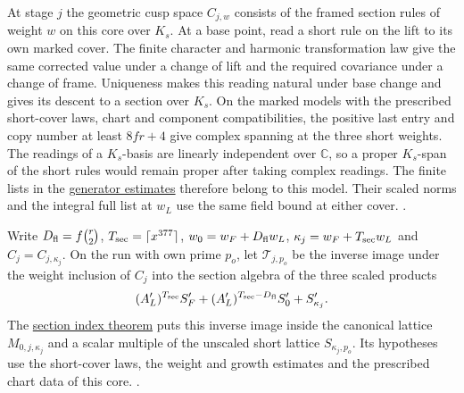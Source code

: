 At stage \(j\) the geometric cusp space \(C_{j,w}\) consists of the
framed section rules of weight \(w\) on this core over \(K_s\).
At a base point, read a short rule on the lift to its own marked
cover. The finite character and harmonic transformation law give the
same corrected value under a change of lift and the required covariance
under a change of frame. Uniqueness makes this reading natural under
base change and gives its descent to a section over \(K_s\). On the
marked models with the prescribed short-cover laws, chart and
component compatibilities, the positive last entry and copy number
at least \(8fr+4\) give complex spanning at the three short weights.
The readings of a \(K_s\)-basis are
linearly independent over \(\mathbb C\), so a proper \(K_s\)-span of
the short rules would remain proper after taking complex readings.
The finite lists in the
\hyperlink{proof.run-short-section-generators}{generator estimates}
therefore belong to this model. Their scaled norms and the integral
full list at \(w_L\) use the same field bound at either cover.
.

Write \(D_{\rm fl}=f\binom r2\), \(T_{\rm sec}=\lceil x^{377}\rceil\),
\(w_0=w_F+D_{\rm fl}w_L\), \(\kappa_j=w_F+T_{\rm sec} w_L\) and
\(C_j=C_{j,\kappa_j}\). On the run with own prime \(p_o\), let
\(\mathcal T_{j,p_o}\) be the inverse image under the weight inclusion
of \(C_j\) into the section algebra of the three scaled products
\[
 (A'_L)^{T_{\rm sec}}S'_F
      +(A'_L)^{T_{\rm sec}-D_{\rm fl}}S'_0+S'_{\kappa_j}.
\]
The \hyperlink{proof.geometric-section-index}{section index theorem}
puts this inverse image inside the canonical lattice \(M_{0,j,\kappa_j}\)
and a scalar multiple of the unscaled short lattice \(S_{\kappa_j,p_o}\).
Its hypotheses use the short-cover laws, the weight and growth
estimates and the prescribed chart data of this core.
.

